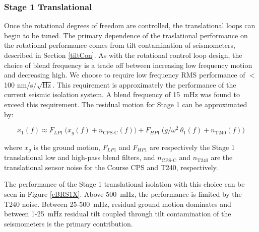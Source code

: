 \documentclass [12pt, proquest]{uwthesis}[2019]
\begin{document}
\subsubsection{Stage 1 Translational}

Once the rotational degrees of freedom are controlled, the translational loops can begin to be tuned. The primary dependence of the traslational performance on the rotational performance comes from tilt contamination of seismometers, described in Section \ref{tiltCon}. As with the rotational control loop design, the choice of blend frequency is a trade off between increasing low frequency motion and decreasing high. We choose to require low frequency RMS performance of $<$ 100 nm/s$/\sqrt{\text{Hz}}$. This requirement is approximately the performance of the current seismic isolation system. A blend frequency of 15~mHz was found to exceed this requirement. The residual motion for Stage 1 can be approximated by:

\begin{equation}
x_1(f)\approx F_{LP1}\ \big(x_g(f)+n_\text{CPS-C}(f)\big)+F_{HP1}\ \big( g/\omega^2\ \theta_1(f) +n_\text{T240}(f) \big)
\end{equation}

where $x_g$ is the ground motion, $F_{LP1}$ and $F_{HP1}$ are respectively the Stage 1 translational low and high-pass blend filters, and $n_\text{CPS-C}$ and $n_\text{T240}$ are the translational sensor noise for the Course CPS and T240, respectively.

The performance of the Stage 1 translational isolation with this choice can be seen in Figure \ref{cBRS1X}. Above 500~mHz, the performance is limited by the T240 noise. Between 25-500~mHz, residual ground motion dominates and between 1-25~mHz residual tilt coupled through tilt contamination of the seismometers is the primary contribution. 
\end{document}
